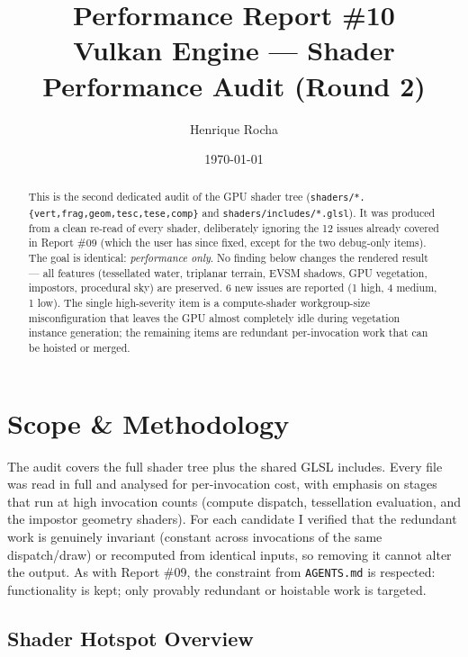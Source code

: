 \documentclass[a4paper,12pt]{article}
\title{\textbf{Performance Report \#10}\\[4pt]
\large Vulkan Engine — Shader Performance Audit (Round 2)}
\author{Henrique Rocha}
\date{\today}
\begin{document}
\maketitle

\begin{abstract}
This is the second dedicated audit of the GPU shader tree
(\texttt{shaders/*.\{vert,frag,geom,tesc,tese,comp\}} and
\texttt{shaders/includes/*.glsl}). It was produced from a clean re-read of
every shader, deliberately ignoring the 12 issues already covered in Report \#09
(which the user has since fixed, except for the two debug-only items). The goal
is identical: \emph{performance only}. No finding below changes the rendered
result — all features (tessellated water, triplanar terrain, EVSM shadows, GPU
vegetation, impostors, procedural sky) are preserved. 6 new issues are reported
(1 high, 4 medium, 1 low). The single high-severity item is a compute-shader
workgroup-size misconfiguration that leaves the GPU almost completely idle during
vegetation instance generation; the remaining items are redundant
per-invocation work that can be hoisted or merged.
\end{abstract}

\tableofcontents
\newpage

\section{Scope \& Methodology}

The audit covers the full shader tree plus the shared GLSL includes. Every file
was read in full and analysed for per-invocation cost, with emphasis on stages
that run at high invocation counts (compute dispatch, tessellation evaluation,
and the impostor geometry shaders). For each candidate I verified that the
redundant work is genuinely invariant (constant across invocations of the same
dispatch/draw) or recomputed from identical inputs, so removing it cannot alter
the output. As with Report \#09, the constraint from \texttt{AGENTS.md} is
respected: functionality is kept; only provably redundant or hoistable work is
targeted.

\subsection*{Shader Hotspot Overview}
\end{document}
